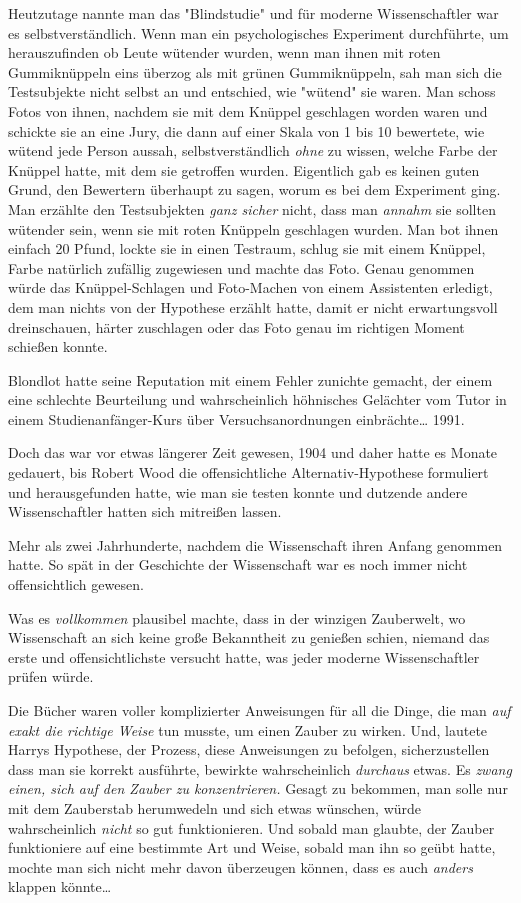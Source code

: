 {Heutzutage nannte man das "Blindstudie" und für moderne Wissenschaftler war es selbstverständlich. Wenn man ein psychologisches Experiment durchführte, um herauszufinden ob Leute wütender wurden, wenn man ihnen mit roten Gummiknüppeln eins überzog als mit grünen Gummiknüppeln, sah man sich die Testsubjekte nicht selbst an und entschied, wie "wütend" sie waren. Man schoss Fotos von ihnen, nachdem sie mit dem Knüppel geschlagen worden waren und schickte sie an eine Jury, die dann auf einer Skala von 1 bis 10 bewertete, wie wütend jede Person aussah, selbstverständlich \emph{ohne} zu wissen, welche Farbe der Knüppel hatte, mit dem sie getroffen wurden. Eigentlich gab es keinen guten Grund, den Bewertern überhaupt zu sagen, worum es bei dem Experiment ging. Man erzählte den Testsubjekten \emph{ganz sicher} nicht, dass man \emph{annahm} sie sollten wütender sein, wenn sie mit roten Knüppeln geschlagen wurden. Man bot ihnen einfach 20 Pfund, lockte sie in einen Testraum, schlug sie mit einem Knüppel, Farbe natürlich zufällig zugewiesen und machte das Foto. Genau genommen würde das Knüppel-Schlagen und Foto-Machen von einem Assistenten erledigt, dem man nichts von der Hypothese erzählt hatte, damit er nicht erwartungsvoll dreinschauen, härter zuschlagen oder das Foto genau im richtigen Moment schießen konnte.

Blondlot hatte seine Reputation mit einem Fehler zunichte gemacht, der einem eine schlechte Beurteilung und wahrscheinlich höhnisches Gelächter vom Tutor in einem Studienanfänger-Kurs über Versuchsanordnungen einbrächte… 1991.

Doch das war vor etwas längerer Zeit gewesen, 1904 und daher hatte es Monate gedauert, bis Robert Wood die offensichtliche Alternativ-Hypothese formuliert und herausgefunden hatte, wie man sie testen konnte und dutzende andere Wissenschaftler hatten sich mitreißen lassen.

Mehr als zwei Jahrhunderte, nachdem die Wissenschaft ihren Anfang genommen hatte. So spät in der Geschichte der Wissenschaft war es noch immer nicht offensichtlich gewesen.

Was es \emph{vollkommen} plausibel machte, dass in der winzigen Zauberwelt, wo Wissenschaft an sich keine große Bekanntheit zu genießen schien, niemand das erste und offensichtlichste versucht hatte, was jeder moderne Wissenschaftler prüfen würde.

Die Bücher waren voller komplizierter Anweisungen für all die Dinge, die man \emph{auf exakt die richtige Weise} tun musste, um einen Zauber zu wirken. Und, lautete Harrys Hypothese, der Prozess, diese Anweisungen zu befolgen, sicherzustellen dass man sie korrekt ausführte, bewirkte wahrscheinlich \emph{durchaus} etwas. Es \emph{zwang einen, sich auf den Zauber zu konzentrieren.} Gesagt zu bekommen, man solle nur mit dem Zauberstab herumwedeln und sich etwas wünschen, würde wahrscheinlich \emph{nicht} so gut funktionieren. Und sobald man glaubte, der Zauber funktioniere auf eine bestimmte Art und Weise, sobald man ihn so geübt hatte, mochte man sich nicht mehr davon überzeugen können, dass es auch \emph{anders} klappen könnte…

}
